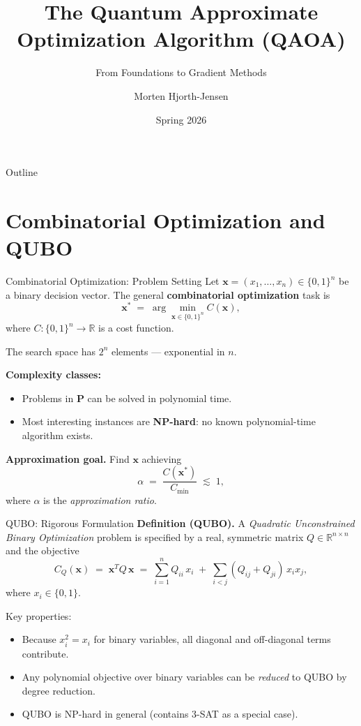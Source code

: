 \documentclass{beamer}
\title{The Quantum Approximate Optimization Algorithm (QAOA)}
\subtitle{From Foundations to Gradient Methods}
\author{Morten Hjorth-Jensen}
\date{Spring 2026}
\begin{document}
\frame{\titlepage}

\begin{frame}{Outline}
\tableofcontents
\end{frame}


\section{Combinatorial Optimization and QUBO}

\begin{frame}{Combinatorial Optimization: Problem Setting}
Let $\mathbf{x} = (x_1,\dots,x_n)\in\{0,1\}^n$ be a binary decision
vector. The general \textbf{combinatorial optimization} task is
\[
\mathbf{x}^* \;=\; \arg\min_{\mathbf{x}\in\{0,1\}^n} C(\mathbf{x}),
\]
where $C:\{0,1\}^n\to\mathbb{R}$ is a cost function.

\medskip

The search space has $2^n$ elements — exponential in $n$.

\medskip

\textbf{Complexity classes:}
\begin{itemize}
\item Problems in \textbf{P} can be solved in polynomial time.
\item Most interesting instances are \textbf{NP-hard}: no known
  polynomial-time algorithm exists.
\end{itemize}

\textbf{Approximation goal.}  Find $\mathbf{x}$ achieving
\[
\alpha \;=\; \frac{C(\mathbf{x}^*)}{C_{\min}} \;\lesssim\; 1,
\]
where $\alpha$ is the \emph{approximation ratio}.
\end{frame}


\begin{frame}{QUBO: Rigorous Formulation}
\textbf{Definition (QUBO).}  A \emph{Quadratic Unconstrained Binary
Optimization} problem is specified by a real, symmetric matrix
$Q\in\mathbb{R}^{n\times n}$ and the objective
\[
\boxed{
C_Q(\mathbf{x}) \;=\; \mathbf{x}^T Q\,\mathbf{x}
\;=\; \sum_{i=1}^n Q_{ii}\,x_i
\;+\; \sum_{i<j}(Q_{ij}+Q_{ji})\,x_i x_j,}
\]
where $x_i\in\{0,1\}$.

Key properties:
\begin{itemize}
\item Because $x_i^2 = x_i$ for binary variables, all diagonal and
  off-diagonal terms contribute.
\item Any polynomial objective over binary variables can be
  \emph{reduced} to QUBO by degree reduction.
\item QUBO is NP-hard in general (contains 3-SAT as a special case).
\end{itemize}
\end{frame}
\end{document}
